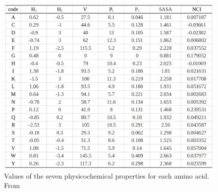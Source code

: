\begin{figure}[h!]
\begin{center}
\includegraphics[height =12 cm, width = 12cm]{img/guo_ph_che.jpeg}
\caption{Values of the seven physicochemical properties for each amino acid. From \cite{Guo08_PPIpred} \label{fig:guo_ph_ch}}
\end{center}
\end{figure}


